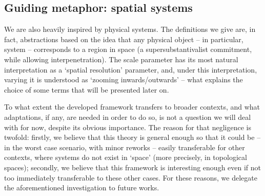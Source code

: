 \subsection{Guiding metaphor: spatial systems}

We are also heavily inspired by physical systems. The definitions we give are, in fact, abstractions based on the idea that any physical object -- in particular, system -- corresponds to a region in space (a supersubstantivalist commitment, while allowing interpenetration). The scale parameter has its most natural interpretation as a `spatial resolution' parameter, and, under this interpretation, varying it is understood as `zooming inwards/outwards' -- what explains the choice of some terms that will be presented later on. 

To what extent the developed framework transfers to broader contexts, and what adaptations, if any, are needed in order to do so, is not a question we will deal with for now, despite its obvious importance. The reason for that negligence is twofold: firstly, we believe that this theory is general enough so that it could be -- in the worst case scenario, with minor reworks -- easily transferable for other contexts, where systems do not exist in `space' (more precisely, in topological spaces); secondly, we believe that this framework is interesting enough even if not too immediately transferable to these other cases. For these reasons, we delegate the aforementioned investigation to future works.
